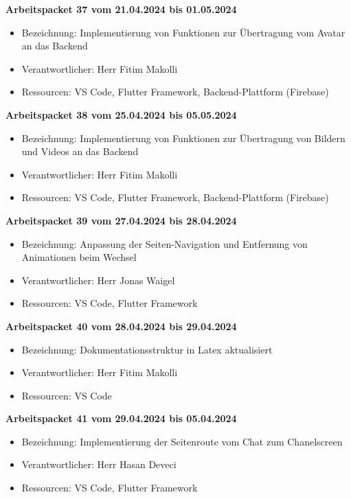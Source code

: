 \textbf{Arbeitspacket 37 vom 21.04.2024 bis 01.05.2024}
\begin{itemize}[itemsep=0pt]
	\item{Bezeichnung: Implementierung von Funktionen zur Übertragung vom Avatar an das Backend}
	\item{Verantwortlicher: Herr Fitim Makolli} 
	\item{Ressourcen: VS Code, Flutter Framework, Backend-Plattform (Firebase)} 
\end{itemize} 

\textbf{Arbeitspacket 38 vom 25.04.2024 bis 05.05.2024}
\begin{itemize}[itemsep=0pt]
	\item{Bezeichnung: Implementierung von Funktionen zur Übertragung von Bildern und Videos an das Backend}
	\item{Verantwortlicher: Herr Fitim Makolli} 
	\item{Ressourcen: VS Code, Flutter Framework, Backend-Plattform (Firebase)} 
\end{itemize}


\textbf{Arbeitspacket 39 vom 27.04.2024 bis 28.04.2024}
\begin{itemize}[itemsep=0pt]
	\item{Bezeichnung: Anpassung der Seiten-Navigation und Entfernung von Animationen beim Wechsel}
	\item{Verantwortlicher: Herr Jonas Waigel} 
	\item{Ressourcen: VS Code, Flutter Framework} 
\end{itemize}

\newpage
\textbf{Arbeitspacket 40 vom 28.04.2024 bis 29.04.2024}
\begin{itemize}[itemsep=0pt]
	\item{Bezeichnung: Dokumentationsstruktur in Latex aktualisiert}
	\item{Verantwortlicher: Herr Fitim Makolli} 
	\item{Ressourcen: VS Code} 
\end{itemize} 

\textbf{Arbeitspacket 41 vom 29.04.2024 bis 05.04.2024}
\begin{itemize}[itemsep=0pt]
	\item{Bezeichnung: Implementierung der Seitenroute vom Chat zum Chanelscreen}
	\item{Verantwortlicher: Herr Hasan Deveci} 
	\item{Ressourcen: VS Code, Flutter Framework} 
\end{itemize} 

